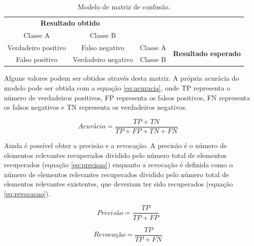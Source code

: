 \begin{table}[h]
  \centering
  \begin{tabular}{cccc}
  \multicolumn{2}{c}{\textbf{Resultado obtido}}                  &                               &                                              \\ \cline{1-2}
  \multicolumn{1}{|c|}{Classe A} & \multicolumn{1}{c|}{Classe B} &                               &                                              \\ \cline{1-3}
  \multicolumn{1}{|c|}{Verdadeiro positivo}       & \multicolumn{1}{c|}{Falso negativo}       & \multicolumn{1}{c|}{Classe A} & \multirow{2}{*}{\textbf{Resultado esperado}} \\ \cline{1-3}
  \multicolumn{1}{|c|}{Falso positivo}       & \multicolumn{1}{c|}{Verdadeiro negativo}       & \multicolumn{1}{c|}{Classe B} &                                              \\ \cline{1-3}
  \end{tabular}
  \caption{Modelo de matriz de confusão.}
  \label{tab:matrixConfusao}
\end{table}

Alguns valores podem ser obtidos através desta matriz. A própria acurácia do modelo pode ser obtida com a equação \ref{eq:acuracia}, onde TP representa o número de verdadeiros positivos, FP representa os falsos positivos, FN representa os falsos negativos e TN representa os verdadeiros negativos.

\begin{equation}
  \displaystyle Acurácia = \frac{TP+TN}{TP+FP+TN+FN}
\label{eq:acuracia}
\end{equation}

Ainda é possível obter a precisão e a revocação. A precisão é o número de elementos relevantes recuperados dividido pelo número total de elementos recuperados (equação \ref{eq:precisao}) enquanto a revocação é definida como o número de elementos relevantes recuperados dividido pelo número total de elementos relevantes existentes, que deveriam ter sido recuperados (equação \ref{eq:revocacao}).

\begin{equation}
  \displaystyle Precisão = \frac{TP}{TP+FP}
\label{eq:precisao}
\end{equation}

\begin{equation}
  \displaystyle Revocação = \frac{TP}{TP+FN}
\label{eq:revocacao}
\end{equation}

